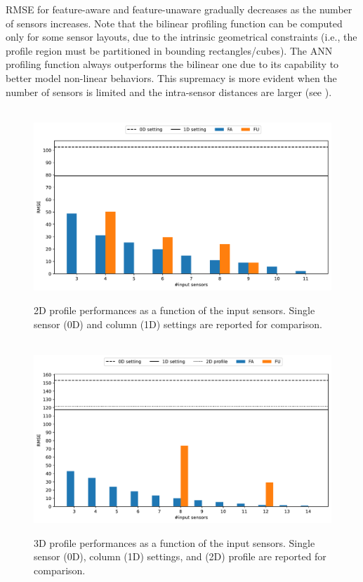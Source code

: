 RMSE for feature-aware and feature-unaware gradually decreases as the number of sensors increases. 
Note that the bilinear profiling function can be computed only for some sensor layouts, due to the intrinsic geometrical constraints (i.e., the profile region must be partitioned in bounding rectangles/cubes). 
The ANN profiling function always outperforms the bilinear one due to its capability to better model non-linear behaviors. 
This supremacy is more evident when the number of sensors is limited and the intra-sensor distances are larger (see ). 
\begin{figure}[t]
\centering\
\includegraphics[scale=.5]{chapters/physics-aware/pluto/img/bar_plot.pdf}
\caption{2D profile performances as a function of the input  sensors. Single sensor (0D) and column (1D) settings are reported for comparison. }
\label{pluto-fig:2Dperformance}
\end{figure}

\begin{figure}[t]
\centering\
\includegraphics[scale=.5]{chapters/physics-aware/pluto/img/3d_bar_plot.pdf}
\caption{3D profile performances as a function of the input  sensors. Single sensor (0D), column (1D) settings, and (2D) profile are reported for comparison.}
\label{pluto-fig:3Dperformance}
\end{figure}

